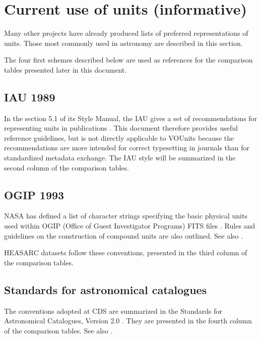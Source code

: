 \documentclass[11pt,a4paper]{ivoa}
\begin{document}
\appendix

\section{Current use of units (informative)}
\label{appx:current}

Many other projects have already produced lists of preferred
representations of units. Those most commonly used in
astronomy are described in this section.

The four first schemes described below are used as references for the
comparison tables presented later in this document.

\subsection{IAU 1989\label{appx:IAU}}

In the section 5.1 of its Style Manual, the IAU gives a set
of recommendations for representing units in publications \citep{wilkins89}. This document
therefore provides useful reference guidelines, but is not directly
applicable to VOUnits because the recommendations are more intended
for correct typesetting in journals than for standardized metadata exchange.
The IAU style will be summarized in the second column of the comparison tables.

\subsection{OGIP 1993}

NASA has defined a list of character strings specifying the basic physical units
used within OGIP (Office of Guest Investigator Programs) FITS files
\citep{george95}. Rules and guidelines on the construction of compound
units are also outlined.  See also .

HEASARC datasets follow these conventions, presented in the third column
of the comparison tables.

\subsection{Standards for astronomical catalogues}

The conventions adopted at CDS are summarized in the Standards for Astronomical
Catalogues, Version 2.0 \citep[\S3.2]{cds00}. They are presented in the fourth column
of the comparison tables.  See also .
\end{document}

